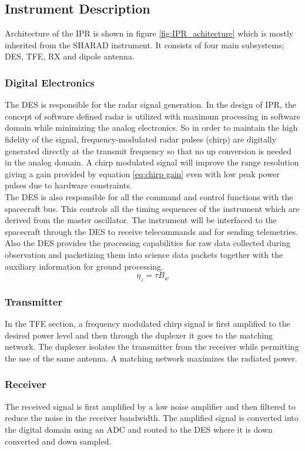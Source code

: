 \subsection{Instrument Description}
Architecture of the \ac{IPR} is shown in figure \ref{fig:IPR_achitecture} which is mostly inherited from the SHARAD instrument. It  consists of four main subsystems; \ac{DES}, \ac{TFE}, \ac{RX} and dipole antenna.
\subsubsection{Digital Electronics}
The \ac{DES} is responsible for the radar signal generation. In the design of \ac{IPR}, the concept of software defined radar is utilized with maximum processing in software domain while minimizing the analog electronics. So in order to maintain the high fidelity of the signal, frequency-modulated radar pulses (chirp) are digitally generated directly at the transmit frequency so that no up conversion is needed in the analog domain. A chirp modulated signal will improve the range resolution giving a gain provided by equation \ref{eq:chirp gain} even with low peak power pulses due to hardware constraints.\\
The \ac{DES} is also responsible for all the command and control functions with the spacecraft bus. This controls all the timing sequences of the instrument which are derived from the master oscillator. The instrument will be interfaced to the spacecraft through the \ac{DES} to receive telecommands and for sending telemetries. Also the \ac{DES} provides the processing capabilities for raw data collected during observation and packetizing them into science data packets together with the auxiliary information for ground processing.
\begin{equation}
\eta_{z} = \tau B_{w}
\label{eq:chirp gain}
\end{equation}
%
\subsubsection{Transmitter}
In the \ac{TFE} section, a frequency modulated chirp signal is first amplified to the desired power level and then through the duplexer it goes to the matching network. The duplexer isolates the transmitter from the receiver while permitting the use of the same antenna. A matching network maximizes the radiated power.
%
\subsubsection{Receiver}
The received signal is first amplified by a low noise amplifier and then filtered to reduce the noise in the receiver bandwidth. The amplified signal is converted into the digital domain using an \ac{ADC} and routed to the \ac{DES} where it is down converted and down sampled.
